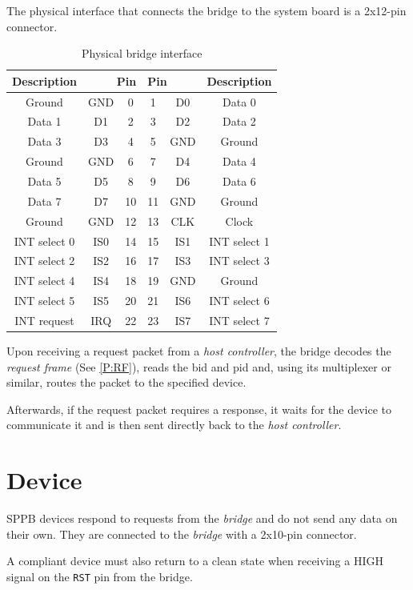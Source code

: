 \documentclass[a4paper,10pt]{article}
\begin{document}
The physical interface that connects the bridge to the system board is a 2x12-pin connector.

\begin{table}[H]
	\centering
	\caption{Physical bridge interface}
	{
		\begin{tabular}{|c|c|c|c|c|c|}
\hline
Description & \multicolumn{2}{|r|}{Pin} & \multicolumn{2}{|l|}{Pin} & Description \\
\hline
Ground & GND & 0 & 1 & D0 & Data 0 \\
\hline
Data 1 & D1 & 2 & 3 & D2 & Data 2 \\
\hline
Data 3 & D3 & 4 & 5 & GND & Ground \\
\hline
Ground & GND & 6 & 7 & D4 & Data 4 \\
\hline
Data 5 & D5 & 8 & 9 & D6 & Data 6 \\
\hline
Data 7 & D7 & 10 & 11 & GND & Ground \\
\hline
Ground & GND & 12 & 13 & CLK & Clock \\
\hline
INT select 0 & IS0 & 14 & 15 & IS1 & INT select 1 \\
\hline
INT select 2 & IS2 & 16 & 17 & IS3 & INT select 3 \\
\hline
INT select 4 & IS4 & 18 & 19 & GND & Ground \\
\hline
INT select 5 & IS5 & 20 & 21 & IS6 & INT select 6 \\
\hline
INT request & IRQ & 22 & 23 & IS7 & INT select 7 \\
\hline
		\end{tabular}
	}
\end{table}

Upon receiving a request packet from a \emph{host controller}, the bridge decodes the \emph{request frame} (See \ref{P:RF}), reads the \gls{bid} and \gls{pid} and, using its multiplexer or similar, routes the packet to the specified device.

Afterwards, if the request packet requires a response, it waits for the device to communicate it and is then sent directly back to the \emph{host controller}.

\section{Device}
\acrshort{SPPB} devices respond to requests from the \emph{bridge} and do not send any data on their own. They are connected to the \emph{bridge} with a 2x10-pin connector.

A compliant device must also return to a clean state when receiving a HIGH signal on the \verb|RST| pin from the bridge.
\end{document}
